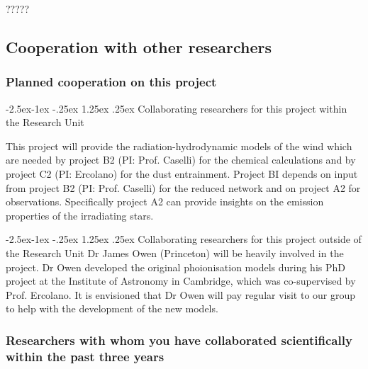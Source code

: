 \documentclass[10pt,fleqn,twoside]{article}
\makeatletter
\newcommand{\Tcol}{\color{blue}}
\renewcommand\paragraph{\@startsection{paragraph}{4}{\z@}%
            {-2.5ex\@plus -1ex \@minus -.25ex}%
            {1.25ex \@plus .25ex}%
            {\normalfont\normalsize\bfseries}}
\makeatother
\begin{document}
?????


\subsection{\Tcol Cooperation with other researchers}

\subsubsection{\Tcol Planned cooperation on this project}

\paragraph{\Tcol Collaborating researchers for this project within the
  Research Unit}


This project will provide the radiation-hydrodynamic models of the
wind which are needed by project B2 (PI: Prof. Caselli) for the
chemical calculations and by project C2 (PI: Ercolano) for the dust
entrainment. Project BI depends on input from project B2 (PI:
Prof. Caselli)  for the reduced network and on
project A2 for observations. Specifically project A2 can
provide insights on the emission properties of the irradiating stars.

\paragraph{\Tcol Collaborating researchers for this project outside of
  the Research Unit}
Dr James Owen (Princeton) will be heavily involved in the
project. Dr Owen developed the original
phoionisation models during his PhD project at the Institute of
Astronomy in Cambridge, which was co-supervised by
Prof. Ercolano. It is envisioned that Dr Owen will pay regular visit
to our group to help with the development of the new models. 

\subsubsection{\Tcol Researchers with whom you have collaborated scientifically within the past three years}
\end{document}
